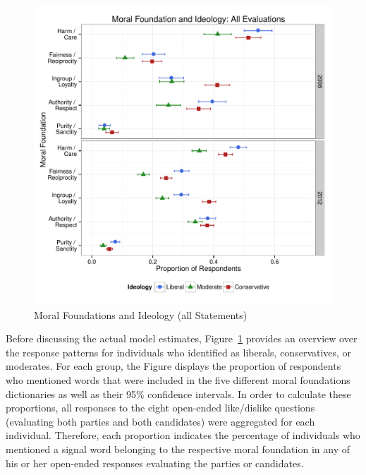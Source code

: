 \documentclass[12pt]{article}
\begin{document}
\begin{figure}[ht]\centering
\includegraphics[scale=.6]{../calc/fig/p1_mft_ideol.pdf}
\caption{Moral Foundations and Ideology (all Statements)}\label{fig:mft_ideol}
\end{figure}

Before discussing the actual model estimates, Figure~\ref{fig:mft_ideol} provides an overview over the response patterns for individuals who identified as liberals, conservatives, or moderates. For each group, the Figure displays the proportion of respondents who mentioned words that were included in the five different moral foundations dictionaries as well as their 95\% confidence intervals. In order to calculate these proportions, all responses to the eight open-ended like/dislike questions (evaluating both parties and both candidates) were aggregated for each individual. Therefore, each proportion indicates the percentage of individuals who mentioned a signal word belonging to the respective moral foundation in any of his or her open-ended responses evaluating the parties or candidates.
\end{document}
